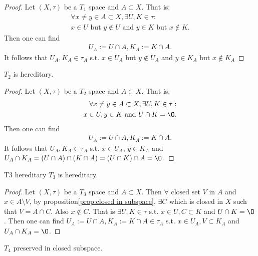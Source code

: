 \begin{proof}
    Let $(X,\tau)$ be a $T_1$ space and $A\subset X$. That is: 
    \begin{align*}
        \forall x\neq y\in A\subset X, \exists U,K\in\tau:\\
        x\in U\text{ but } y\notin U\text{ and } y\in K\text{ but } x\notin K.
    \end{align*}
    Then one can find
    \begin{align*}
        U_A := U\cap A, K_A:=K\cap A.
    \end{align*}
    It follows that $U_A,K_A\in \tau_A$ s.t. $x\in U_A$ but $y\notin U_A$ and $y\in K_A$ but $x\notin K_A$
\end{proof}


\begin{proposition}{}{}
    $T_2$ is hereditary. 
\end{proposition}

\begin{proof}
    Let $(X,\tau)$ be a $T_2$ space and $A\subset X$. That is: 
    \begin{align*}
        \forall x\neq y\in A\subset X, \exists U,K\in\tau:\\
        x\in U,y\in K\text{ and } U\cap K=\O.
    \end{align*}
    Then one can find
    \begin{align*}
        U_A := U\cap A, K_A:=K\cap A.
    \end{align*}
    It follows that $U_A,K_A\in \tau_A$ s.t. $x\in U_A$, $y\in K_A$ and $U_A\cap K_A=(U\cap A)\cap (K\cap A)=(U\cap K)\cap A=\O$.
\end{proof}

\begin{proposition}{}{T3 hereditary}
    $T_3$ is hereditary. 
\end{proposition}

\begin{proof}
    Let $(X,\tau)$ be a $T_3$ space and $A\subset X$. Then
    $\forall \text{ closed set } V$ in $A$ and $x\in A\setminus V$, by proposition\ref{prop:closed in subspace}, $\exists C$ which is closed in $X$ such that $V=A\cap C$.
    Also $x\notin C$. That is 
    $\exists U,K\in\tau$ s.t. $x\in U, C\subset K$ and $U\cap K=\O$. 
    Then one can find $U_A:= U\cap A, K_A:= K\cap A\in \tau_A$ s.t. $x\in U_A,V\subset K_A$ and $U_A\cap K_A=\O$.
\end{proof}

\begin{proposition}{}{}
    $T_4$ preserved in closed subspace.
\end{proposition}

